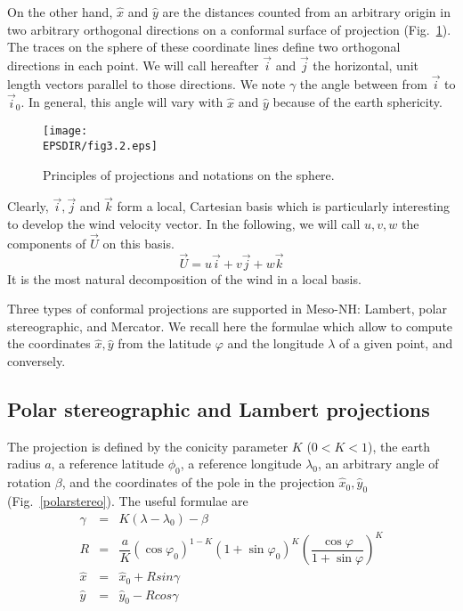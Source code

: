 On the other hand, $\widehat{x}$ and $\widehat{y}$
are the distances counted from an arbitrary origin in two arbitrary orthogonal
directions on a conformal surface of projection (Fig.~\ref{projection}).
The traces
on the sphere of these coordinate lines define two orthogonal directions
in each point.  We will call hereafter $\vec{i}$ and $\vec{j}$ the horizontal,
unit length vectors parallel to those directions.
We note $\gamma$ the angle between from $\vec{i}$ to
$\vec{i}_0$. In general, this angle will vary with $\widehat{x}$ and
$\widehat{y}$ because of the earth sphericity.

\begin{figure}[!ht]
\centerline{\texttt{[image: \\EPSDIR/fig3.2.eps]}}
\caption{Principles of projections and notations on the sphere.}
\label{projection}
\end{figure}

Clearly, $\vec{i},\vec{j}$ and $\vec{k}$ form a local, Cartesian basis
which is particularly interesting to develop the wind
velocity vector. In the following, we will call $ u ,  v , w$ the
components of ${\vec U}$ on this basis.
\begin{equation}
\vec{U}=u\vec{i}+v\vec{j}+w\vec{k}
\end{equation}
It is the most natural decomposition of the wind in a local basis.

Three types of conformal projections are supported in Meso-NH: Lambert, polar
stereographic, and Mercator. We recall here the formulae which allow to
compute the coordinates $\widehat{x},\widehat{y}$ from the latitude $\varphi$
and the longitude $\lambda$ of a given point, and conversely.

\subsection{Polar stereographic and Lambert projections}

The projection is defined by the conicity parameter $K$ ($0<K<1$), the
earth radius $a$,
a reference latitude $\phi_0$, a reference
longitude $\lambda_0$, an arbitrary angle of rotation $\beta$,
and the coordinates of the pole in the projection
$\widehat{x}_0, \widehat{y}_0$ (Fig.~\ref{polarstereo}).
The useful formulae are
\begin{eqnarray}
\gamma & = & K (\lambda - \lambda _{0}) - \beta \nonumber \\
R &  = & \dfrac{a}{K} (\cos\varphi _{0})^{1-K} (1 + \sin\varphi _{0})^{K}
\left(\dfrac{\cos\varphi }{1 + \sin\varphi}\right)^{K} \nonumber \\
\widehat{x}& = & \widehat{x}_0 + R sin\gamma \\
\widehat{y}& = & \widehat{y}_0 - R cos \gamma \nonumber
\end{eqnarray}

